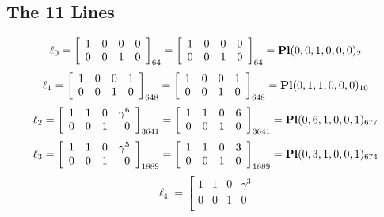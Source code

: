 \documentclass{article}
\begin{document}
{\subsection*{The 11 Lines}
$$
\ell_{0} = 
\left[
\begin{array}{*{4}{r}}
1 & 0 & 0 & 0\\
0 & 0 & 1 & 0\\
\end{array}
\right]
_{64}
=
\left[
\begin{array}{*{4}c}
1  & 0  & 0  & 0\\
0  & 0  & 1  & 0\\
\end{array}
\right]_{64}
={\rm\bf Pl}(0,0,1,0,0,0 )_{2}$$
$$
\ell_{1} = 
\left[
\begin{array}{*{4}{r}}
1 & 0 & 0 & 1\\
0 & 0 & 1 & 0\\
\end{array}
\right]
_{648}
=
\left[
\begin{array}{*{4}c}
1  & 0  & 0  & 1\\
0  & 0  & 1  & 0\\
\end{array}
\right]_{648}
={\rm\bf Pl}(0,1,1,0,0,0 )_{10}$$
$$
\ell_{2} = 
\left[
\begin{array}{*{4}{r}}
1 & 1 & 0 & \gamma^{6}\\
0 & 0 & 1 & 0\\
\end{array}
\right]
_{3641}
=
\left[
\begin{array}{*{4}c}
1  & 1  & 0  & 6\\
0  & 0  & 1  & 0\\
\end{array}
\right]_{3641}
={\rm\bf Pl}(0,6,1,0,0,1 )_{677}$$
$$
\ell_{3} = 
\left[
\begin{array}{*{4}{r}}
1 & 1 & 0 & \gamma^{5}\\
0 & 0 & 1 & 0\\
\end{array}
\right]
_{1889}
=
\left[
\begin{array}{*{4}c}
1  & 1  & 0  & 3\\
0  & 0  & 1  & 0\\
\end{array}
\right]_{1889}
={\rm\bf Pl}(0,3,1,0,0,1 )_{674}$$
$$
\ell_{4} = 
\left[
\begin{array}{*{4}{r}}
1 & 1 & 0 & \gamma^{3}\\
0 & 0 & 1 & 0\\

\end{array}$$}
\end{document}
